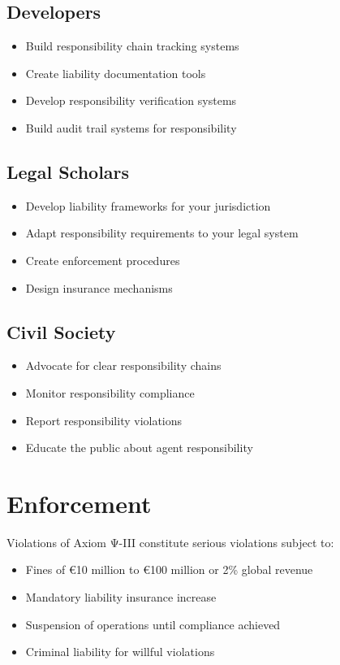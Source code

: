 \subsection{Developers}

\begin{itemize}
    \item Build responsibility chain tracking systems
    \item Create liability documentation tools
    \item Develop responsibility verification systems
    \item Build audit trail systems for responsibility
\end{itemize}

\subsection{Legal Scholars}

\begin{itemize}
    \item Develop liability frameworks for your jurisdiction
    \item Adapt responsibility requirements to your legal system
    \item Create enforcement procedures
    \item Design insurance mechanisms
\end{itemize}

\subsection{Civil Society}

\begin{itemize}
    \item Advocate for clear responsibility chains
    \item Monitor responsibility compliance
    \item Report responsibility violations
    \item Educate the public about agent responsibility
\end{itemize}

\vspace{0.5cm}

\section{Enforcement}

Violations of Axiom Ψ-III constitute serious violations subject to:

\begin{itemize}
    \item Fines of €10 million to €100 million or 2\% global revenue
    \item Mandatory liability insurance increase
    \item Suspension of operations until compliance achieved
    \item Criminal liability for willful violations
\end{itemize}

\cleardoublepage
